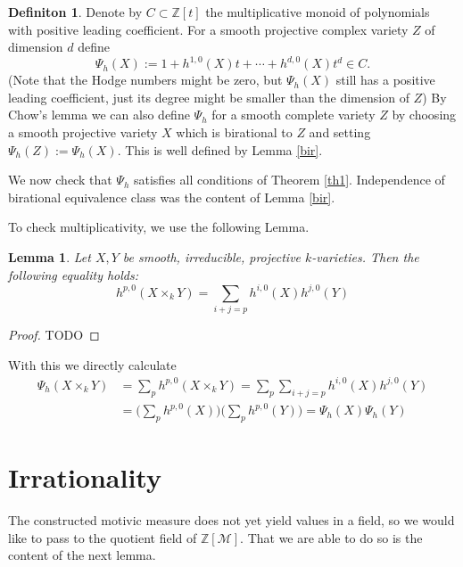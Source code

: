 \documentclass[11pt, a4paper, german]{article}
\theoremstyle{plain}
\newtheorem{lemma}[theorem]{Lemma}
\theoremstyle{definition}
\newtheorem{definition}[theorem]{Definiton}
\begin{document}
\begin{definition}
    Denote by $C \subset \mathbb{Z}[t]$ the multiplicative monoid of polynomials with positive leading coefficient.
    For a smooth projective complex variety $Z$ of dimension $d$ define
    \[
        \Psi_h(X) := 1 + h^{1,0}(X)t + \cdots + h^{d,0}(X)t^d \in C.
    \]
    (Note that the Hodge numbers might be zero, but $\Psi_h(X)$ still has a positive leading coefficient, 
    just its degree might be smaller than the dimension of $Z$)
    By Chow's lemma we can also define $\Psi_h$ for a smooth complete variety $Z$ by choosing a smooth projective variety $X$ which is birational
    to $Z$ and setting $\Psi_h(Z) := \Psi_h(X)$. This is well defined by Lemma \ref{bir}.
\end{definition}

We now check that $\Psi_h$ satisfies all conditions of Theorem \ref{th1}. Independence of birational equivalence class was the content of Lemma
\ref{bir}. 

To check multiplicativity, we use the following Lemma.

\begin{lemma}
    Let $X,Y$ be smooth, irreducible, projective $k$-varieties. Then the following equality holds:
    \[
        h^{p,0}(X \times_k Y) = \sum_{i+j=p} h^{i,0}(X)h^{j,0}(Y)
    \]
\end{lemma}
\begin{proof} TODO \end{proof}

With this we directly calculate
\begin{align*}
    \Psi_h(X \times_k Y) & = \sum_p h^{p,0}(X \times_k Y) = \sum_p \sum_{i+j=p} h^{i,0}(X)h^{j,0}(Y) \\
    & = \Big (\sum_p h^{p,0}(X) \Big) \Big(\sum_p h^{p,0}(Y)\Big) = \Psi_h(X) \Psi_h(Y)
\end{align*}


\section{Irrationality}

The constructed motivic measure does not yet yield values in a field, so we would like to pass to the quotient field of $\mathbb{Z}[\mathcal{M}]$.
That we are able to do so is the content of the next lemma.
\end{document}
